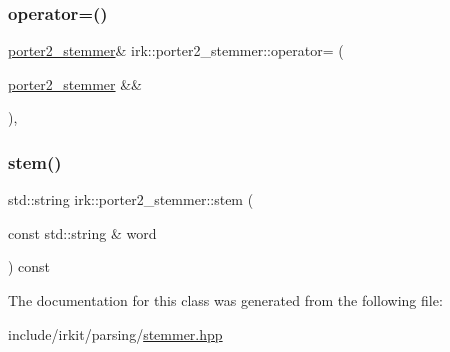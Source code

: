 \subsubsection{\texorpdfstring{operator=()}{operator=()}\hspace{0.1cm}{\footnotesize\ttfamily [2/2]}}
{\footnotesize\ttfamily \mbox{\hyperlink{classirk_1_1porter2__stemmer}{porter2\+\_\+stemmer}}\& irk\+::porter2\+\_\+stemmer\+::operator= (\begin{DoxyParamCaption}\item[{\mbox{\hyperlink{classirk_1_1porter2__stemmer}{porter2\+\_\+stemmer}} \&\&}]{ }\end{DoxyParamCaption})\hspace{0.3cm}{\ttfamily [default]}, {\ttfamily [noexcept]}}

\mbox{\label{classirk_1_1porter2__stemmer_a81a8cfefee92421e6bf88cbab78f5cf3}} 
\subsubsection{\texorpdfstring{stem()}{stem()}}
{\footnotesize\ttfamily std\+::string irk\+::porter2\+\_\+stemmer\+::stem (\begin{DoxyParamCaption}\item[{const std\+::string \&}]{word }\end{DoxyParamCaption}) const\hspace{0.3cm}{\ttfamily [inline]}}



The documentation for this class was generated from the following file\+:\begin{DoxyCompactItemize}
\item 
include/irkit/parsing/\mbox{\hyperlink{stemmer_8hpp}{stemmer.\+hpp}}\end{DoxyCompactItemize}
